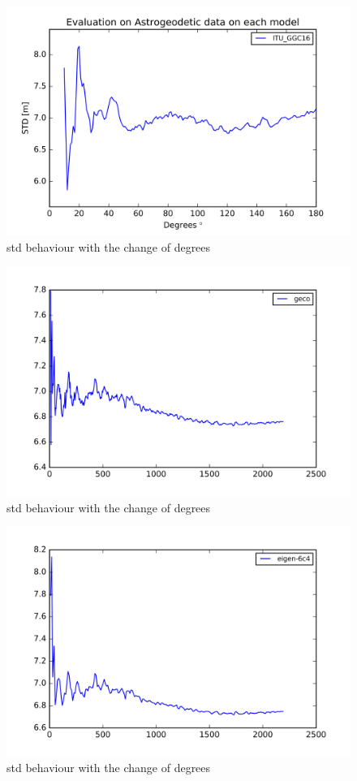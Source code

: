       
      \begin{figure}[t]
      	\caption{std behaviour with the change of degrees}
      	\label{itu_ggc16_figure}
      	\includegraphics{Figures/ITU_GGC16_figure.png}
      	\centering
      \end{figure}
      
      
      \begin{figure}[t]
      	\caption{std behaviour with the change of degrees}
      	\label{geco_figure}
      	\includegraphics{Figures/geco_figure.png}
      	\centering
      \end{figure}
      
      \begin{figure}[t]
      	\caption{std behaviour with the change of degrees}
      	\label{eigen_6c4_figure}
      	\includegraphics{Figures/eigen-6c4_figure.png}
      	\centering
      \end{figure}